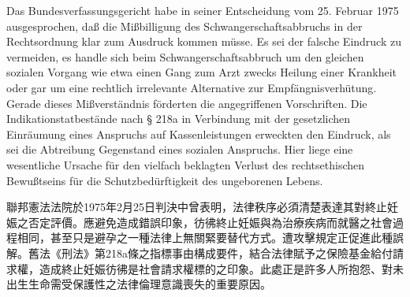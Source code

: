 \documentclass[12pt]{article}
\begin{document}
\begin{sourcepara}[title={原文理由 B.I.2.b} Rn 99]
Das Bundesverfassungsgericht habe in seiner Entscheidung vom 25. Februar 1975 ausgesprochen, daß die Mißbilligung des Schwangerschaftsabbruchs in der Rechtsordnung klar zum Ausdruck kommen müsse. Es sei der falsche Eindruck zu vermeiden, es handle sich beim Schwangerschaftsabbruch um den gleichen sozialen Vorgang wie etwa einen Gang zum Arzt zwecks Heilung einer Krankheit oder gar um eine rechtlich irrelevante Alternative zur Empfängnisverhütung. Gerade dieses Mißverständnis förderten die angegriffenen Vorschriften. Die Indikationstatbestände nach § 218a \abbrStGB{} \abbrAF{} in Verbindung mit der gesetzlichen Einräumung eines Anspruchs auf Kassenleistungen erweckten den Eindruck, als sei die Abtreibung Gegenstand eines sozialen Anspruchs. Hier liege eine wesentliche Ursache für den vielfach beklagten Verlust des rechtsethischen Bewußtseins für die Schutzbedürftigkeit des ungeborenen Lebens.
\end{sourcepara}
\begin{transpara}
聯邦憲法法院於1975年2月25日判決中曾表明，法律秩序必須清楚表達其對終止妊娠之否定評價。應避免造成錯誤印象，彷彿終止妊娠與為治療疾病而就醫之社會過程相同，甚至只是避孕之一種法律上無關緊要替代方式。遭攻擊規定正促進此種誤解。舊法《刑法》第218a條之指標事由構成要件，結合法律賦予之保險基金給付請求權，造成終止妊娠彷彿是社會請求權標的之印象。此處正是許多人所抱怨、對未出生生命需受保護性之法律倫理意識喪失的重要原因。
\end{transpara}
\end{document}
